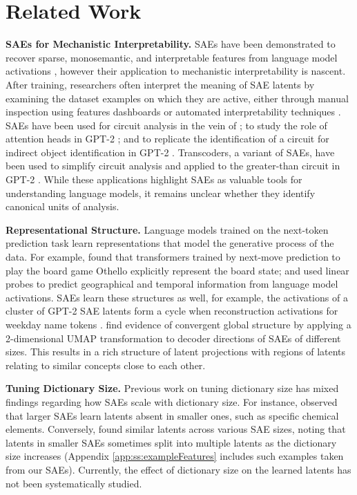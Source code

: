 \section{Related Work}
\textbf{SAEs for Mechanistic Interpretability.} SAEs have been demonstrated to recover sparse, monosemantic, and interpretable features from language model activations \citep{towardsmonosemanticity, leesaes, scalingmono, topksaes, gatedsaes, jumprelusaes}, however their application to mechanistic interpretability is nascent. After training, researchers often interpret the meaning of SAE latents by examining the dataset examples on which they are active, either through manual inspection using features dashboards \citep{towardsmonosemanticity} or automated interpretability techniques \citep{topksaes}. SAEs have been used for circuit analysis \citep{sparsefeaturecircuits} in the vein of \citep{olah2020zoom, olsson2022context}; to study the role of attention heads in GPT-2 \citep{kissane2024interpreting}; and to replicate the identification of a circuit for indirect object identification in GPT-2 \citep{makelov2024towards}. Transcoders, a variant of SAEs, have been used to simplify circuit analysis and applied to the greater-than circuit in GPT-2 \citep{dunefsky2024transcoders}. While these applications highlight SAEs as valuable tools for understanding language models, it remains unclear whether they identify canonical units of analysis.


\textbf{Representational Structure.} Language models trained on the next-token prediction task learn representations that model the generative process of the data. For example, \citet{li2022emergent} found that transformers trained by next-move prediction to play the board game Othello explicitly represent the board state; and \citet{gurnee2023language} used linear probes to predict geographical and temporal information from language model activations. SAEs learn these structures as well, for example, the activations of a cluster of GPT-2 SAE latents form a cycle when reconstruction activations for weekday name tokens \citep{engels2024not}. \citet{towardsmonosemanticity} find evidence of convergent global structure by applying a 2-dimensional UMAP transformation to decoder directions of SAEs of different sizes. This results in a rich structure of latent projections with regions of latents relating to similar concepts close to each other.

\textbf{Tuning Dictionary Size.} Previous work on tuning dictionary size has mixed findings regarding how SAEs scale with dictionary size. For instance, \citet{scalingmono} observed that larger SAEs learn latents absent in smaller ones, such as specific chemical elements. Conversely, \citet{towardsmonosemanticity} found similar latents across various SAE sizes, noting that latents in smaller SAEs sometimes split into multiple latents as the dictionary size increases (Appendix \ref{app:ss:exampleFeatures} includes such examples taken from our SAEs). Currently, the effect of dictionary size on the learned latents has not been systematically studied.

